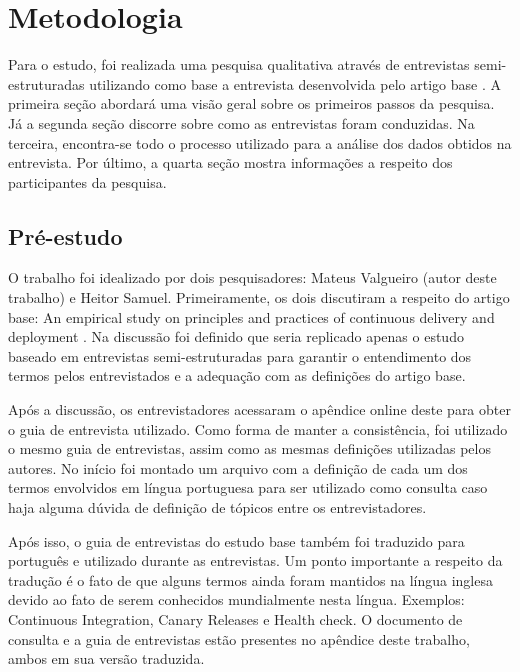
\chapter{Metodologia}

Para o estudo, foi realizada uma pesquisa qualitativa através de entrevistas semi-estruturadas utilizando como base a entrevista desenvolvida pelo artigo base \cite{empiricalStudy2016}. A primeira seção abordará uma visão geral sobre os primeiros passos da pesquisa.  Já a segunda seção discorre sobre como as entrevistas foram conduzidas. Na terceira, encontra-se todo o processo utilizado para a análise dos dados obtidos na entrevista. Por último, a quarta seção mostra informações a respeito dos participantes da pesquisa.


\section{Pré-estudo}

O trabalho foi idealizado por dois pesquisadores: Mateus Valgueiro (autor deste trabalho) e Heitor Samuel. Primeiramente, os dois discutiram a respeito do artigo base: An empirical study on principles and practices of continuous delivery and deployment \cite{empiricalStudy2016}. Na discussão foi definido que seria replicado apenas o estudo baseado em entrevistas semi-estruturadas para garantir o entendimento dos termos pelos entrevistados e a adequação com as definições do artigo base. 

Após a discussão, os entrevistadores acessaram o apêndice online deste para obter o guia de entrevista utilizado. Como forma de manter a consistência, foi utilizado o mesmo guia de entrevistas, assim como as mesmas definições utilizadas pelos autores. No início foi montado um arquivo com a definição de cada um dos termos envolvidos em língua portuguesa para ser utilizado como consulta caso haja alguma dúvida de definição de tópicos entre os entrevistadores.

Após isso, o guia de entrevistas do estudo base também foi traduzido para português e utilizado durante as entrevistas. Um ponto importante a respeito da tradução é o fato de que alguns termos ainda foram mantidos na língua inglesa devido ao fato de serem conhecidos mundialmente nesta língua. Exemplos: Continuous Integration, Canary Releases e Health check.
O documento de consulta e a guia de entrevistas estão presentes no apêndice deste trabalho, ambos em sua versão traduzida.


